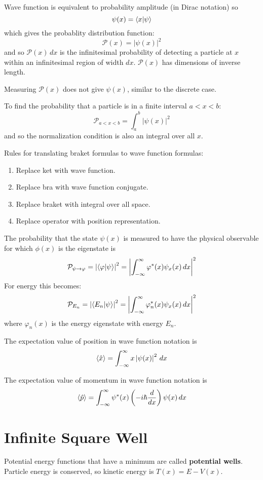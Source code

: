 \documentclass[11pt]{article}
\begin{document}
Wave function is equivalent to probability amplitude (in Dirac notation) so
$$
\psi(x) = \braket{x | \psi}
$$
which gives the probablity distribution function:
$$
\mathcal{P}(x) = \left| \psi(x) \right|^{2}
$$
and so \(\mathcal{P}(x) \, dx\) is the infinitesimal probability of detecting a particle at \(x\) within an
infinitesimal region of width \(dx\).
\(\mathcal{P}(x)\) has dimensions of inverse length.

Measuring \(\mathcal{P}(x)\) does not give \(\psi(x)\), similar to the discrete case.

To find the probability that a particle is in a finite interval \(a < x < b\):
$$
\mathcal{P}_{a < x < b} = \int_{a}^{b} \left| \psi(x) \right|^{2}
$$
and so the normalization condition is also an integral over all \(x\).

Rules for translating braket formulas to wave function formulas:
\begin{enumerate}
\item Replace ket with wave function.
\item Replace bra with wave function conjugate.
\item Replace braket with integral over all space.
\item Replace operator with position representation.
\end{enumerate}

The probability that the state \(\psi(x)\) is measured to have the physical observable for which
\(\phi(x)\) is the eigenstate is
$$
\mathcal{P}_{\psi \to \varphi} = \left| \braket{\varphi | \psi} \right|^{2}
= \left| \int_{-\infty}^{\infty} \varphi^{*}(x) \psi_{x}(x) \, dx \right|^{2}
$$
For energy this becomes:
$$
\mathcal{P}_{E_{n}} = \left| \braket{E_{n} | \psi} \right|^{2}
= \left| \int_{-\infty}^{\infty} \varphi_{n}^{*}(x) \psi_{x}(x) \, dx \right|^{2}
$$
where \(\varphi_{n}(x)\) is the energy eigenstate with energy \(E_{n}\).

The expectation value of position in wave function notation is
$$
\braket{\hat{x}} = \int_{-\infty}^{\infty} x \left| \psi(x) \right|^{2} \, dx
$$

The expectation value of momentum in wave function notation is
$$
\braket{\hat{p}} = \int_{-\infty}^{\infty} \psi^{*}(x) \left(-i\hslash\frac{d}{dx}\right) \psi(x)\, dx
$$
\section{Infinite Square Well}
\label{sec:orgbefb710}
Potential energy functions that have a minimum are called \textbf{potential wells}.
Particle energy is conserved, so kinetic energy is \(T(x) = E - V(x)\).
\end{document}
